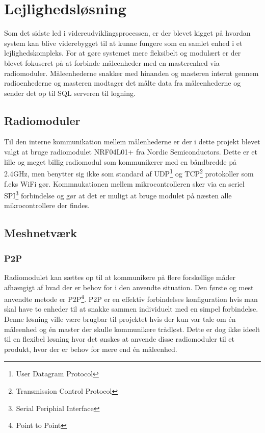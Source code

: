 \section{Lejlighedsløsning}
Som det sidste led i videreudviklingsprocessen, er der blevet kigget på hvordan system kan blive viderebygget til at kunne fungere som en samlet enhed i et lejlighedskompleks. For at gøre systemet mere fleksibelt og modulært er der blevet fokuseret på at forbinde måleenheder med en masterenhed via radiomoduler. Måleenhederne snakker med hinanden og masteren internt gennem radioenhederne og masteren modtager det målte data fra måleenhederne og sender det op til SQL serveren til logning.

\subsection{Radiomoduler}
Til den interne kommunikation mellem målenhederne er der i dette projekt blevet valgt at bruge radiomodulet NRF04L01+ fra Nordic Semiconductors.
\newline
Dette er et lille og meget billig radiomodul som kommunikerer med en båndbredde på 2.4GHz, men benytter sig ikke som standard af UDP\footnote{User Datagram Protocol} og TCP\footnote{Transmission Control Protocol} protokoller som f.eks WiFi gør. 
Kommnukationen mellem mikrocontrolleren sker via en seriel SPI\footnote{Serial Periphial Interface} forbindelse og gør at det er muligt at bruge modulet på næsten alle mikrocontrollere der findes.

\subsection{Meshnetværk}
\subsubsection*{P2P}
Radiomodulet kan sættes op til at kommunikere på flere forskellige måder afhængigt af hvad der er behov for i den anvendte situation.
Den første og mest anvendte metode er P2P\footnote{Point to Point}.
\newline
P2P er en effektiv forbindelses konfiguration hvis man skal have to enheder til at snakke sammen individuelt med en simpel forbindelse. Denne løsning ville være brugbar til projektet hvis der kun var tale om én måleenhed og én master der skulle kommunikere trådløst. Dette er dog ikke ideelt til en flexibel løsning hvor det ønskes at anvende disse radiomoduler til et produkt, hvor der er behov for mere end én måleenhed.

